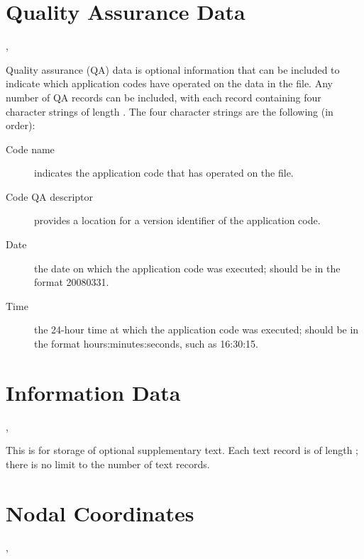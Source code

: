 \section{Quality Assurance Data}

\begin{spacing}{1.5}
\api {}, 
\end{spacing}

Quality assurance (QA) data is optional information that can be
included to indicate which application codes have operated on the data
in the file. Any number of QA records can be included, with each
record containing four character strings of length
. The four character strings are the following
(in order):

\begin{description}

\item[Code name] indicates the application code that has operated
on the \exo{} file.

\item[Code QA descriptor] provides a location for a version
identifier of the application code.

\item[Date] the date on which the application code was executed;
should be in the format 20080331.

 \item[Time] the 24-hour time at which the application code
was executed; should be in the format hours:minutes:seconds,
such as 16:30:15.
 \end{description}


\section{Information Data}


\begin{spacing}{1.5}
\api {}, 
\end{spacing}

This is for storage of optional supplementary text. Each text record
is of length ; there is no limit to the
number of text records.


\section{Nodal Coordinates}


\begin{spacing}{1.5}
\api {}, 
\end{spacing}

